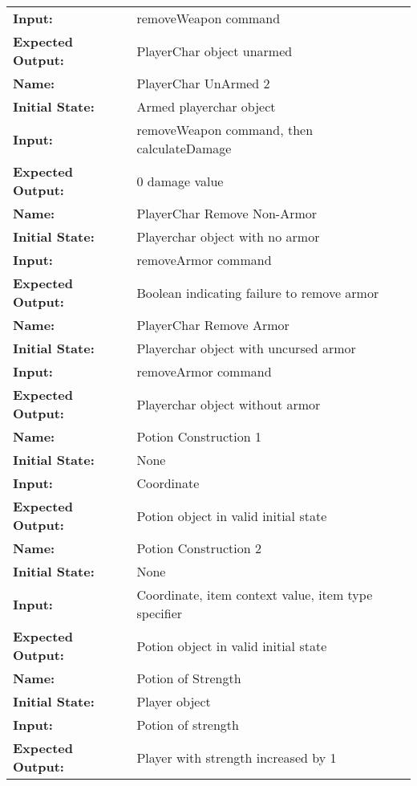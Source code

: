 \documentclass[12pt, titlepage]{article}
\begin{document}
\begin{center}
\begin{longtable}{ l | p{10cm} }
				\textbf{Input:} & removeWeapon command\\
				\textbf{Expected Output:} & PlayerChar object unarmed\\[0.6em]
				\hline
				\rule{0pt}{1.5em}\textbf{Name:} & PlayerChar UnArmed 2\\
				\textbf{Initial State:} & Armed playerchar object\\
				\textbf{Input:} & removeWeapon command, then calculateDamage\\
				\textbf{Expected Output:} & 0 damage value\\[0.6em]
				\hline
				\rule{0pt}{1.5em}\textbf{Name:} & PlayerChar Remove Non-Armor\\
				\textbf{Initial State:} & Playerchar object with no armor\\
				\textbf{Input:} & removeArmor command\\
				\textbf{Expected Output:} & Boolean indicating failure to remove armor\\[0.6em]
				\hline
				\rule{0pt}{1.5em}\textbf{Name:} & PlayerChar Remove Armor\\
				\textbf{Initial State:} & Playerchar object with uncursed armor\\
				\textbf{Input:} & removeArmor command\\
				\textbf{Expected Output:} & Playerchar object without armor\\[0.6em]
				\hline
				\rule{0pt}{1.5em}\textbf{Name:} & Potion Construction 1\\
				\textbf{Initial State:} & None\\
				\textbf{Input:} & Coordinate\\
				\textbf{Expected Output:} & Potion object in valid initial state\\[0.6em]
				\hline
				\rule{0pt}{1.5em}\textbf{Name:} & Potion Construction 2\\
				\textbf{Initial State:} & None\\
				\textbf{Input:} & Coordinate, item context value, item type specifier\\
				\textbf{Expected Output:} & Potion object in valid initial state\\[0.6em]
				\hline
				\rule{0pt}{1.5em}\textbf{Name:} & Potion of Strength\\
				\textbf{Initial State:} & Player object\\
				\textbf{Input:} & Potion of strength\\
				\textbf{Expected Output:} & Player with strength increased by 1\\[0.6em]

\end{longtable}
\end{center}
\end{document}
